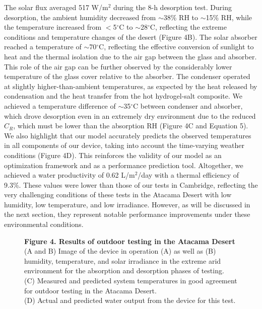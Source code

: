\documentclass[11pt]{article}
\newcommand{\figbox}[1]{%
  \fbox{\parbox[c][#1][c]{0.92\textwidth}{\centering\itshape [figure image]}}}
\begin{document}
The solar flux averaged 517 W/m$^{2}$ during the 8-h desorption test. During desorption, the ambient humidity decreased from $\sim$38\% RH to $\sim$15\% RH, while the temperature increased from $<$5$^{\circ}$C to $\sim$28$^{\circ}$C, reflecting the extreme conditions and temperature changes of the desert (Figure 4B). The solar absorber reached a temperature of $\sim$70$^{\circ}$C, reflecting the effective conversion of sunlight to heat and the thermal isolation due to the air gap between the glass and absorber. This role of the air gap can be further observed by the considerably lower temperature of the glass cover relative to the absorber. The condenser operated at slightly higher-than-ambient temperatures, as expected by the heat released by condensation and the heat transfer from the hot hydrogel-salt composite. We achieved a temperature difference of $\sim$35$^{\circ}$C between condenser and absorber, which drove desorption even in an extremely dry environment due to the reduced $C_{R}$, which must be lower than the absorption RH (Figure 4C and Equation 5). We also highlight that our model accurately predicts the observed temperatures in all components of our device, taking into account the time-varying weather conditions (Figure 4D). This reinforces the validity of our model as an optimization framework and as a performance prediction tool. Altogether, we achieved a water productivity of 0.62 L/m$^{2}$/day with a thermal efficiency of 9.3\%. These values were lower than those of our tests in Cambridge, reflecting the very challenging conditions of these tests in the Atacama Desert with low humidity, low temperature, and low irradiance. However, as will be discussed in the next section, they represent notable performance improvements under these environmental conditions.

\begin{figure}[!ht]
\centering
\figbox{7cm}
\caption*{\textbf{Figure 4. Results of outdoor testing in the Atacama Desert}\\
(A and B) Image of the device in operation (A) as well as (B) humidity, temperature, and solar irradiance in the extreme arid environment for the absorption and desorption phases of testing.\\
(C) Measured and predicted system temperatures in good agreement for outdoor testing in the Atacama Desert.\\
(D) Actual and predicted water output from the device for this test.}
\end{figure}

\end{document}
